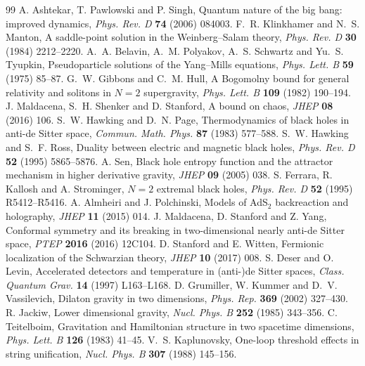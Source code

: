 \begin{thebibliography}{99}
 A. Ashtekar, T. Pawlowski and P. Singh, Quantum nature of the big bang: improved dynamics, \emph{Phys. Rev. D} \textbf{74} (2006) 084003.
 F.~R. Klinkhamer and N.~S. Manton, A saddle-point solution in the Weinberg--Salam theory, \emph{Phys. Rev. D} \textbf{30} (1984) 2212--2220.
 A.~A. Belavin, A.~M. Polyakov, A.~S. Schwartz and Yu.~S. Tyupkin, Pseudoparticle solutions of the Yang--Mills equations, \emph{Phys. Lett. B} \textbf{59} (1975) 85--87.
 G.~W. Gibbons and C.~M. Hull, A Bogomolny bound for general relativity and solitons in $N=2$ supergravity, \emph{Phys. Lett. B} \textbf{109} (1982) 190--194.
 J. Maldacena, S.~H. Shenker and D. Stanford, A bound on chaos, \emph{JHEP} \textbf{08} (2016) 106.
 S.~W. Hawking and D.~N. Page, Thermodynamics of black holes in anti-de Sitter space, \emph{Commun. Math. Phys.} \textbf{87} (1983) 577--588.
 S.~W. Hawking and S.~F. Ross, Duality between electric and magnetic black holes, \emph{Phys. Rev. D} \textbf{52} (1995) 5865--5876.
 A. Sen, Black hole entropy function and the attractor mechanism in higher derivative gravity, \emph{JHEP} \textbf{09} (2005) 038.
 S. Ferrara, R. Kallosh and A. Strominger, $N=2$ extremal black holes, \emph{Phys. Rev. D} \textbf{52} (1995) R5412--R5416.
 A. Almheiri and J. Polchinski, Models of AdS$_2$ backreaction and holography, \emph{JHEP} \textbf{11} (2015) 014.
 J. Maldacena, D. Stanford and Z. Yang, Conformal symmetry and its breaking in two-dimensional nearly anti-de Sitter space, \emph{PTEP} \textbf{2016} (2016) 12C104.
 D. Stanford and E. Witten, Fermionic localization of the Schwarzian theory, \emph{JHEP} \textbf{10} (2017) 008.
 S. Deser and O. Levin, Accelerated detectors and temperature in (anti-)de Sitter spaces, \emph{Class. Quantum Grav.} \textbf{14} (1997) L163--L168.
 D. Grumiller, W. Kummer and D.~V. Vassilevich, Dilaton gravity in two dimensions, \emph{Phys. Rep.} \textbf{369} (2002) 327--430.
 R. Jackiw, Lower dimensional gravity, \emph{Nucl. Phys. B} \textbf{252} (1985) 343--356.
 C. Teitelboim, Gravitation and Hamiltonian structure in two spacetime dimensions, \emph{Phys. Lett. B} \textbf{126} (1983) 41--45.
 V.~S. Kaplunovsky, One-loop threshold effects in string unification, \emph{Nucl. Phys. B} \textbf{307} (1988) 145--156.

\end{thebibliography}
